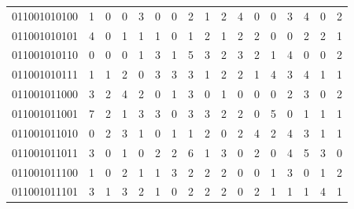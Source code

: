 \documentclass[10pt,a4paper]{article}
\begin{document}
\begin{longtable}{ |c|c|c|c|c|c|c|c|c|c|c|c|c|c|c|c|c| }
    011001010100              & 1                            & 0                                & 0                            & 3                              & 0   & 0   & 2   & 1   & 2   & 4   & 0   & 0   & 3   & 4   & 0   & 2   \\
    011001010101              & 4                            & 0                                & 1                            & 1                              & 1   & 0   & 1   & 2   & 1   & 2   & 2   & 0   & 0   & 2   & 2   & 1   \\
    011001010110              & 0                            & 0                                & 0                            & 1                              & 3   & 1   & 5   & 3   & 2   & 3   & 2   & 1   & 4   & 0   & 0   & 2   \\
    011001010111              & 1                            & 1                                & 2                            & 0                              & 3   & 3   & 3   & 1   & 2   & 2   & 1   & 4   & 3   & 4   & 1   & 1   \\
    011001011000              & 3                            & 2                                & 4                            & 2                              & 0   & 1   & 3   & 0   & 1   & 0   & 0   & 0   & 2   & 3   & 0   & 2   \\
    011001011001              & 7                            & 2                                & 1                            & 3                              & 3   & 0   & 3   & 3   & 2   & 2   & 0   & 5   & 0   & 1   & 1   & 1   \\
    011001011010              & 0                            & 2                                & 3                            & 1                              & 0   & 1   & 1   & 2   & 0   & 2   & 4   & 2   & 4   & 3   & 1   & 1   \\
    011001011011              & 3                            & 0                                & 1                            & 0                              & 2   & 2   & 6   & 1   & 3   & 0   & 2   & 0   & 4   & 5   & 3   & 0   \\
    011001011100              & 1                            & 0                                & 2                            & 1                              & 1   & 3   & 2   & 2   & 2   & 0   & 0   & 1   & 3   & 0   & 1   & 2   \\
    011001011101              & 3                            & 1                                & 3                            & 2                              & 1   & 0   & 2   & 2   & 2   & 0   & 2   & 1   & 1   & 1   & 4   & 1   \\

\end{longtable}
\end{document}
